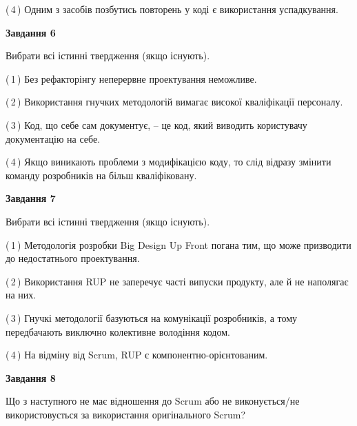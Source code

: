 \documentclass[10pt, ukrainian]{article}
\begin{document}
{\begin {large}
(\,4\,) Одним з засобів позбутись повторень у коді є використання успадкування. %

\newpage

{\begin {center}\textbf{Завдання 6}\end {center}}\par
Вибрати всі істинні твердження (якщо існують).\par
\vspace{2mm}



(\,1\,) Без рефакторінгу неперервне проектування неможливе. %



(\,2\,) Використання гнучких методологій вимагає високої кваліфікації персоналу. %



(\,3\,) Код, що себе сам документує, -- це код, який виводить користувачу документацію на себе. %



(\,4\,) Якщо виникають проблеми з модифікацією коду, то слід відразу змінити команду розробників на більш кваліфіковану.%


{\begin {center}\textbf{Завдання 7}\end {center}}\par
Вибрати всі істинні твердження (якщо існують).\par
\vspace{2mm}



(\,1\,) Методологія розробки Big Design Up Front погана тим, що може призводити до недостатнього проектування.%



(\,2\,) Використання RUP не заперечує часті випуски продукту, але й не наполягає на них. %



(\,3\,) Гнучкі методології базуються на комунікації розробників, а тому передбачають виключно колективне володіння кодом. %



(\,4\,) На відміну від Scrum, RUP є компонентно-орієнтованим. %


{\begin {center}\textbf{Завдання 8}\end {center}}\par
Що з наступного не має відношення до Scrum або не виконується/не використовується за використання оригінального Scrum?\par
\vspace{2mm}




\end{large}}
\end{document}
